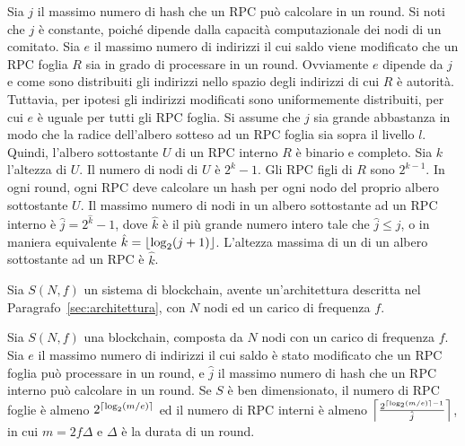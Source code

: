 Sia $j$ il massimo numero di hash che un RPC può calcolare in un round. Si noti che $j$ è constante, poiché dipende dalla capacità computazionale dei nodi di un comitato. Sia $e$ il massimo numero di indirizzi il cui saldo viene modificato che un RPC foglia $R$ sia in grado di processare in un round. Ovviamente $e$ dipende da $j$ e come sono distribuiti gli indirizzi nello spazio degli indirizzi di cui $R$ è autorità. Tuttavia, per ipotesi gli indirizzi modificati sono uniformemente distribuiti, per cui $e$ è uguale per tutti gli RPC foglia. Si assume che $j$ sia grande abbastanza in modo che la radice dell'albero sotteso ad un RPC foglia sia sopra il livello $l$. Quindi, l'albero sottostante $U$ di un RPC interno $R$ è binario e completo. Sia $k$ l'altezza di $U$. Il numero di nodi di $U$ è $2^k-1$. Gli RPC figli di $R$ sono $2^{k-1}$. In ogni round, ogni RPC deve calcolare un hash per ogni nodo del proprio albero sottostante $U$. Il massimo numero di nodi in un albero sottostante ad un RPC interno è $\hat{j} = 2^{\hat{k}}-1$, dove $\hat{k}$ è il più grande numero intero tale che $\hat{j} \leq j$, o in maniera equivalente $\hat{k} = \floor*{\log_2 (j+1)}$. L'altezza massima di un di un albero sottostante ad un RPC è $\hat{k}$.

Sia $S(N, f)$ un sistema di blockchain, avente un'architettura descritta nel Paragrafo~\ref{sec:architettura}, con $N$ nodi ed un carico di frequenza $f$.

\begin{lemma}\label{lemma:rpc_count}
Sia $S(N, f)$ una blockchain, composta da $N$ nodi con un carico di frequenza $f$. Sia $e$ il massimo numero di indirizzi il cui saldo è stato modificato che un RPC foglia può processare in un round, e $\hat{j}$ il massimo numero di hash che un RPC interno può calcolare in un round. Se $S$ è ben dimensionato, il numero di RPC foglie è almeno $2^{\ceil*{\log_2 (m/e)}}$ ed il numero di RPC interni è almeno $\ceil*{\frac{2^{\ceil*{\log_2 (m/e)} - 1}}{\hat{j}}}$, in cui $m = 2 f \Delta$ e $\Delta$ è la durata di un round.
\end{lemma}

